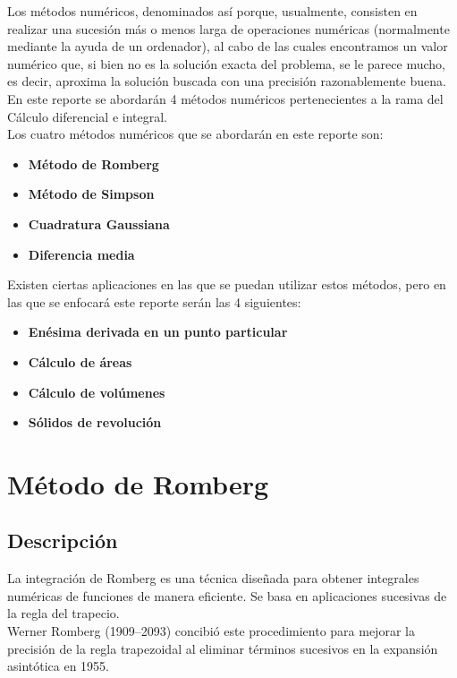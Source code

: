 \documentclass[journal,transmag]{IEEEtran}
\theoremstyle{mytheoremstyle}
\theoremstyle{mytheoremstyle}
\theoremstyle{myproblemstyle}
\begin{document}
Los métodos numéricos, denominados así porque, usualmente, consisten
en realizar una sucesión más o menos larga de operaciones numéricas (normalmente mediante la ayuda de un
ordenador), al cabo de las cuales encontramos un valor numérico que, si bien no es la solución exacta del
problema, se le parece mucho, es decir, aproxima la solución buscada con una precisión razonablemente buena. \cite{apunteClase}
\\
En este reporte se abordarán 4 métodos numéricos pertenecientes a la rama del Cálculo diferencial e integral.
\\
Los cuatro métodos numéricos que se abordarán en este reporte son: 
\begin{itemize}
    \item \textbf{Método de Romberg}
    \item  \textbf{Método de Simpson}
    \item   \textbf{Cuadratura Gaussiana}
    \item   \textbf{Diferencia media}
\end{itemize}
Existen ciertas aplicaciones en las que se puedan utilizar estos métodos, pero en las que se enfocará este reporte serán las 4 siguientes:
\begin{itemize}
    \item \textbf{Enésima derivada en un punto particular}
    \item \textbf{Cálculo de áreas}
    \item \textbf{Cálculo de volúmenes}
    \item \textbf{Sólidos de revolución}
\end{itemize}

\section{Método de Romberg}
\subsection{Descripción}

La integración de Romberg es una técnica diseñada para obtener integrales numéricas
de funciones de manera eficiente. Se basa en aplicaciones sucesivas de la regla del trapecio. \cite{chapra_mtodos_2007}
\\
Werner Romberg (1909–2093) concibió este procedimiento para mejorar la precisión de la regla 
trapezoidal al eliminar términos sucesivos en la expansión asintótica en 1955. \cite{burden_numerical_2016}
\\
\end{document}
